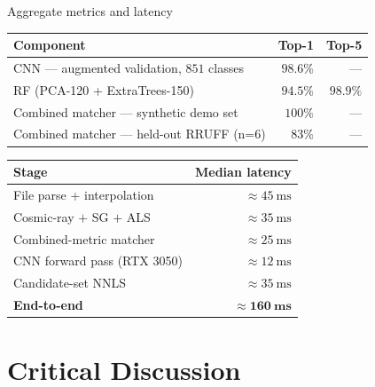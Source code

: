 \documentclass[10pt,aspectratio=169,xcolor=dvipsnames]{beamer}
\begin{document}
\begin{frame}{Aggregate metrics and latency}
  \begin{table}\centering\small
    \begin{tabular}{@{}lrr@{}}
      \toprule
      \textbf{Component} & \textbf{Top-1} & \textbf{Top-5}\\
      \midrule
      CNN — augmented validation, $851$ classes & $98.6\%$ & --- \\
      RF (PCA-120 + ExtraTrees-150) & $94.5\%$ & $98.9\%$\\
      Combined matcher — synthetic demo set & $100\%$ &  --- \\
      Combined matcher — held-out RRUFF (n=6) & $83\%$ & --- \\
      \bottomrule
    \end{tabular}
  \end{table}
  \medskip
  \begin{table}\centering\small
    \begin{tabular}{@{}lr@{}}
      \toprule
      \textbf{Stage} & \textbf{Median latency}\\
      \midrule
      File parse + interpolation       & $\approx \SI{45}{\milli\second}$\\
      Cosmic-ray $+$ SG $+$ ALS        & $\approx \SI{35}{\milli\second}$\\
      Combined-metric matcher          & $\approx \SI{25}{\milli\second}$\\
      CNN forward pass (RTX 3050)      & $\approx \SI{12}{\milli\second}$\\
      Candidate-set NNLS               & $\approx \SI{35}{\milli\second}$\\
      \midrule
      \textbf{End-to-end}              & $\boldsymbol{\approx \SI{160}{\milli\second}}$\\
      \bottomrule
    \end{tabular}
  \end{table}
\end{frame}

\section{Critical Discussion}
\end{document}
